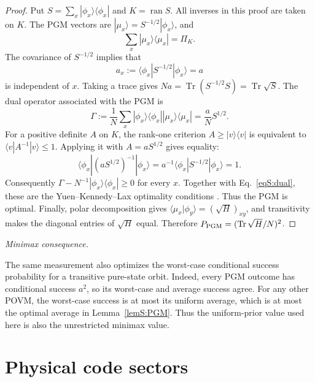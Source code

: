 \documentclass[journal,twocolumn]{IEEEtran}
\theoremstyle{definition}
\theoremstyle{plain}
\newcommand{\Tr}{\operatorname{Tr}}
\newcommand{\ran}{\operatorname{ran}}
\begin{document}
\begin{proof}
Put $S=\sum_x|\phi_x\rangle\!\langle\phi_x|$ and
$K=\ran S$.  All inverses in this proof are taken on $K$.  The PGM vectors
are $|\mu_x\rangle=S^{-1/2}|\phi_x\rangle$, and
\begin{equation}
 \sum_x|\mu_x\rangle\!\langle\mu_x|=\Pi_K.
 \label{eqS:PGMresolution}
\end{equation}
The covariance of $S^{-1/2}$ implies that
\begin{equation}
 a_x:=\langle\phi_x|S^{-1/2}|\phi_x\rangle=a
 \label{eqS:a-constant}
\end{equation}
is independent of $x$.  Taking a trace gives
$Na=\Tr(S^{-1/2}S)=\Tr\sqrt S$.  The dual operator associated with the PGM
is
\begin{equation}
 \Gamma:=\frac1N\sum_x
 |\phi_x\rangle\!\langle\phi_x|
 |\mu_x\rangle\!\langle\mu_x|
 =\frac{a}{N}S^{1/2}.
 \label{eqS:dual}
\end{equation}
For a positive definite $A$ on $K$, the rank-one criterion
$A\geq|v\rangle\!\langle v|$ is equivalent to
$\langle v|A^{-1}|v\rangle\leq1$.  Applying it with
$A=aS^{1/2}$ gives equality:
\begin{equation}
 \langle\phi_x|(aS^{1/2})^{-1}|\phi_x\rangle
 =a^{-1}\langle\phi_x|S^{-1/2}|\phi_x\rangle=1.
 \label{eqS:rankone}
\end{equation}
Consequently $\Gamma-N^{-1}|\phi_x\rangle\!\langle\phi_x|\geq0$ for every
$x$.  Together with Eq.~\eqref{eqS:dual}, these are the
Yuen--Kennedy--Lax optimality conditions
\cite{YuenKennedyLax1975,EldarMegretskiVerghese2004}.  Thus the PGM is
optimal.  Finally, polar decomposition gives
$\langle\mu_x|\phi_y\rangle=(\sqrt H)_{xy}$, and transitivity makes the
diagonal entries of $\sqrt H$ equal.  Therefore
$P_{\rm PGM}=(\Tr\sqrt H/N)^2$.
\end{proof}

\smallskip\noindent\emph{Minimax consequence.}
\label{app:minimax}

The same measurement also optimizes the worst-case conditional success
probability for a transitive pure-state orbit.  Indeed, every PGM outcome
has conditional success $a^2$, so its worst-case and average success agree.
For any other POVM, the worst-case success is at most its uniform average,
which is at most the optimal average in Lemma~\ref{lemS:PGM}.  Thus the
uniform-prior value used here is also the unrestricted minimax value.

\section{Physical code sectors}
\label{app:filtration}
\end{document}
